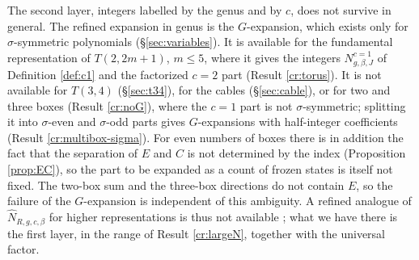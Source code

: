 The second layer, integers labelled by the genus and by $c$, does not survive in general. The refined expansion in genus is the $G$-expansion, which exists only for $\sigma$-symmetric polynomials (\S\ref{sec:variables}). It is available for the fundamental representation of $T(2,2m+1)$, $m \le 5$, where it gives the integers $N^{c=1}_{g,\beta,J}$ of Definition \ref{def:c1} and the factorized $c = 2$ part (Result \ref{cr:torus}). It is not available for $T(3,4)$ (\S\ref{sec:t34}), for the cables (\S\ref{sec:cable}), or for two and three boxes (Result \ref{cr:noG}), where the $c = 1$ part is not $\sigma$-symmetric; splitting it into $\sigma$-even and $\sigma$-odd parts gives $G$-expansions with half-integer coefficients (Result \ref{cr:multibox-sigma}). For even numbers of boxes there is in addition the fact that the separation of $E$ and $C$ is not determined by the index (Proposition \ref{prop:EC}), so the part to be expanded as a count of frozen states is itself not fixed. The two-box sum and the three-box directions do not contain $E$, so the failure of the $G$-expansion is independent of this ambiguity. A refined analogue of $\hat N_{R,g,c,\beta}$ for higher representations is thus not available \open; what we have there is the first layer, in the range of Result \ref{cr:largeN}, together with the universal factor.
